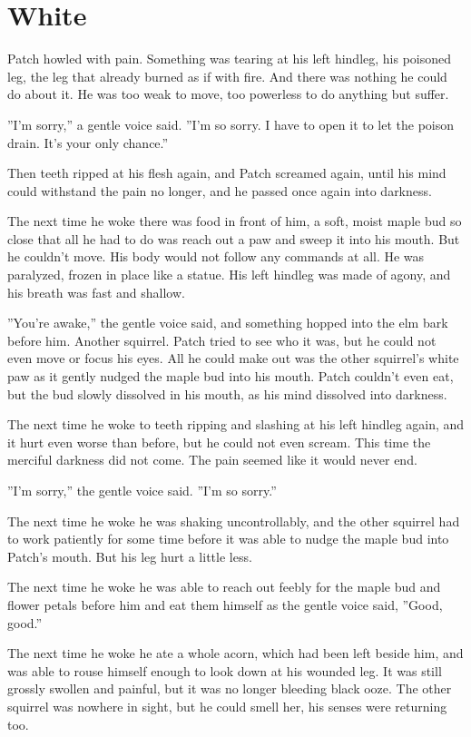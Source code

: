 \documentclass[12pt]{book}
\begin{document}
\section{White}

Patch howled with pain. Something was tearing at his left hindleg, his poisoned leg, the leg that already burned as if with fire. And there was nothing he could do about it. He was too weak to move, too powerless to do anything but suffer.

''I'm sorry,'' a gentle voice said. ''I'm so sorry. I have to open it to let the poison drain. It's your only chance.''

Then teeth ripped at his flesh again, and Patch screamed again, until his mind could withstand the pain no longer, and he passed once again into darkness.

The next time he woke there was food in front of him, a soft, moist maple bud so close that all he had to do was reach out a paw and sweep it into his mouth. But he couldn't move. His body would not follow any commands at all. He was paralyzed, frozen in place like a statue. His left hindleg was made of agony, and his breath was fast and shallow.

''You're awake,'' the gentle voice said, and something hopped into the elm bark before him. Another squirrel. Patch tried to see who it was, but he could not even move or focus his eyes. All he could make out was the other squirrel's white paw as it gently nudged the maple bud into his mouth. Patch couldn't even eat, but the bud slowly dissolved in his mouth, as his mind dissolved into darkness.

The next time he woke to teeth ripping and slashing at his left hindleg again, and it hurt even worse than before, but he could not even scream. This time the merciful darkness did not come. The pain seemed like it would never end.

''I'm sorry,'' the gentle voice said. ''I'm so sorry.''

The next time he woke he was shaking uncontrollably, and the other squirrel had to work patiently for some time before it was able to nudge the maple bud into Patch's mouth. But his leg hurt a little less.

The next time he woke he was able to reach out feebly for the maple bud and flower petals before him and eat them himself as the gentle voice said, ''Good, good.''

The next time he woke he ate a whole acorn, which had been left beside him, and was able to rouse himself enough to look down at his wounded leg. It was still grossly swollen and painful, but it was no longer bleeding black ooze. The other squirrel was nowhere in sight, but he could smell her, his senses were returning too.
\end{document}
